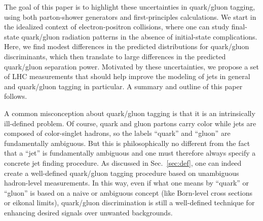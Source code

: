 \documentclass[11pt,letterpaper]{article}
\DeclareRobustCommand{\Sec}[1]{Sec.~\ref{#1}}
\begin{document}
The goal of this paper is to highlight these uncertainties in quark/gluon tagging, using both parton-shower generators and first-principles calculations.  We start in the idealized context of electron-positron collisions, where one can study final-state quark/gluon radiation patterns in the absence of initial-state complications.  Here, we find modest differences in the predicted distributions for quark/gluon discriminants, which then translate to large differences in the predicted quark/gluon separation power.  Motivated by these uncertainties, we propose a set of LHC measurements that should help improve the modeling of jets in general and quark/gluon tagging in particular.  A summary and outline of this paper follows.

A common misconception about quark/gluon tagging is that it is an intrinsically ill-defined problem.  Of course, quark and gluon partons carry color while jets are composed of color-singlet hadrons, so the labels ``quark'' and ``gluon'' are fundamentally ambiguous. 
But this is philosophically no different from the fact that a ``jet'' is
fundamentally ambiguous and one must therefore always specify a concrete jet
finding procedure.  As discussed in \Sec{sec:def}, one can indeed create a
well-defined quark/gluon tagging procedure based on unambiguous hadron-level measurements.  In this way, even if what one means by ``quark'' or ``gluon'' is based on a naive or ambiguous concept (like Born-level cross sections or eikonal limits), quark/gluon discrimination is still a well-defined technique for enhancing desired signals over unwanted backgrounds.
\end{document}
